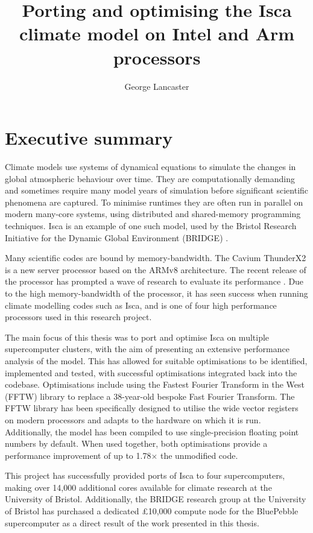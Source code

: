 \documentclass[a4paper,11pt]{report}
\title{Porting and optimising the Isca climate model on Intel and Arm processors}
\author{George Lancaster}
\begin{document}

\chapter*{Executive summary}
Climate models use systems of dynamical equations to simulate the changes in global atmospheric behaviour over time. They are computationally demanding and sometimes require many model years of simulation before significant scientific phenomena are captured. To minimise runtimes they are often run in parallel on modern many-core systems, using distributed and shared-memory programming techniques. Isca is an example of one such model, used by the Bristol Research Initiative for the Dynamic Global Environment (BRIDGE) \cite{vallis2018isca}.
\par
Many scientific codes are bound by memory-bandwidth. The Cavium ThunderX2 is a new server processor based on the ARMv8 architecture. The recent release of the processor has prompted a wave of research to evaluate its performance \cite{calore2018advanced,mcintosh2018performance}. Due to the high memory-bandwidth of the processor, it has seen success when running climate modelling codes such as Isca, and is one of four high performance processors used in this research project.
\par
The main focus of this thesis was to port and optimise Isca on multiple supercomputer clusters, with the aim of presenting an extensive performance analysis of the model. This has allowed for suitable optimisations to be identified, implemented and tested, with successful optimisations integrated back into the codebase. Optimisations include using the Fastest Fourier Transform in the West (FFTW) library to replace a 38-year-old bespoke Fast Fourier Transform. The FFTW library has been specifically designed to utilise the wide vector registers on modern processors and adapts to the hardware on which it is run. Additionally, the model has been compiled to use single-precision floating point numbers by default. When used together, both optimisations provide a performance improvement of up to 1.78$\times$ the unmodified code. 
\par
This project has successfully provided ports of Isca to four supercomputers, making over 14,000 additional cores available for climate research at the University of Bristol. Additionally, the BRIDGE research group at the University of Bristol has purchased a dedicated £10,000 compute node for the BluePebble supercomputer as a direct result of the work presented in this thesis. 
\end{document}
